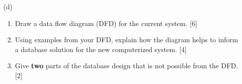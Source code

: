 \begin{enumerate}
\item[(d)]  
\begin{enumerate}
\item Draw a data flow diagram (DFD) for the current system. \hfill{}{[}6{]}
\item Using examples from your DFD, explain how the diagram helps to inform
a database solution for the new computerized system. \hfill{}{[}4{]}
\item Give \textbf{two} parts of the database design that is not possible
from the DFD. \hfill{}{[}2{]}
\end{enumerate}
\end{enumerate}